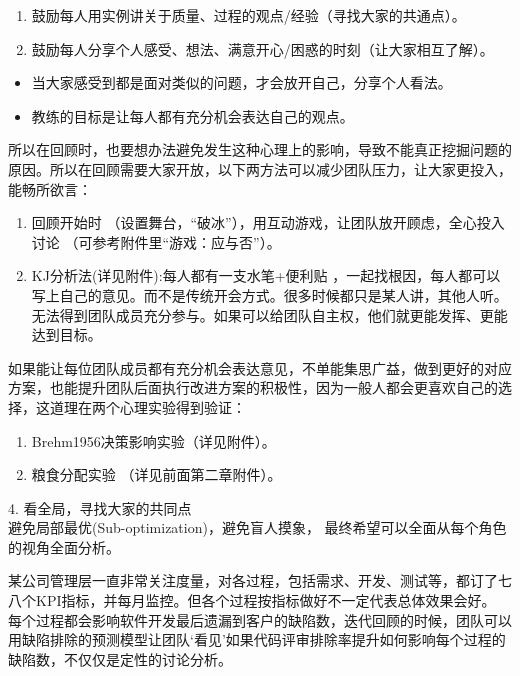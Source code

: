 \begin{enumerate}
\tightlist
\item
  鼓励每人用实例讲关于质量、过程的观点/经验（寻找大家的共通点）。
\item
  鼓励每人分享个人感受、想法、满意开心/困惑的时刻（让大家相互了解）。
\end{enumerate}

\begin{itemize}
\tightlist
\item
  当大家感受到都是面对类似的问题，才会放开自己，分享个人看法。
\item
  教练的目标是让每人都有充分机会表达自己的观点。
\end{itemize}

所以在回顾时，也要想办法避免发生这种心理上的影响，导致不能真正挖掘问题的原因。所以在回顾需要大家开放，以下两方法可以减少团队压力，让大家更投入，能畅所欲言：

\begin{enumerate}
\tightlist
\item
  回顾开始时
  （设置舞台，``破冰''），用互动游戏，让团队放开顾虑，全心投入讨论
  （可参考附件里``游戏：应与否''）。
\item
  KJ分析法(详见附件):每人都有一支水笔+便利贴 ，一起找根因，每人都可以写上自己的意见。而不是传统开会方式。很多时候都只是某人讲，其他人听。无法得到团队成员充分参与。如果可以给团队自主权，他们就更能发挥、更能达到目标。\\
\end{enumerate}

如果能让每位团队成员都有充分机会表达意见，不单能集思广益，做到更好的对应方案，也能提升团队后面执行改进方案的积极性，因为一般人都会更喜欢自己的选择，这道理在两个心理实验得到验证：

\begin{enumerate}
\tightlist
\item
  Brehm1956决策影响实验（详见附件）。
\item
  粮食分配实验 （详见前面第二章附件）。
\end{enumerate}


4. 看全局，寻找大家的共同点\\
避免局部最优(Sub-optimization)，避免盲人摸象，
最终希望可以全面从每个角色的视角全面分析。

某公司管理层一直非常关注度量，对各过程，包括需求、开发、测试等，都订了七八个KPI指标，并每月监控。但各个过程按指标做好不一定代表总体效果会好。
每个过程都会影响软件开发最后遗漏到客户的缺陷数，迭代回顾的时候，团队可以用缺陷排除的预测模型让团队`看见'如果代码评审排除率提升如何影响每个过程的缺陷数，不仅仅是定性的讨论分析。

